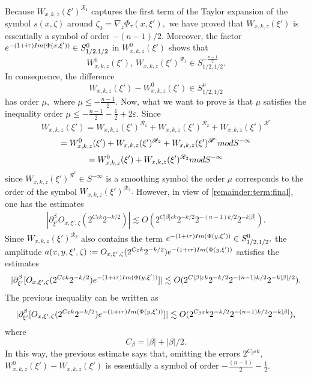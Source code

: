 \documentclass[12pt, reqno]{amsart}
\theoremstyle{definition}
\theoremstyle{remark}
\numberwithin{equation}{section}
\begin{document}
Because $W_{x,k,z}(\xi')^{\mathscr{R}_1}$ captures the first term of the Taylor expansion of the symbol $s(x,\zeta)$ around $\zeta_0=\nabla_{z}\Phi_\tau(x,\xi'),$ we have proved that $W_{x,k,z}(\xi')$ is essentially a symbol of order $-(n-1)/2.$ Moreover, the factor $e^{-(1+i\tau)\textnormal{Im}(\Phi(x,\xi'))}\in  S^{0}_{1/2,1/2}$ in $ W^{0}_{x,k,z}(\xi')$ shows that
$$ W^{0}_{x,k,z}(\xi'),\, W_{x,k,z}(\xi')^{\mathscr{R}_1}\in S^{-\frac{n-1}{2}}_{1/2,1/2}.  $$ In consequence, the difference
$$ W_{x,k,z}(\xi')- W^{0}_{x,k,z}(\xi') \in  S^{\mu}_{1/2,1/2}$$
has order $\mu,$ where $\mu\leq -\frac{n-1}{2}. $ Now, what we want to prove is that $\mu$ satisfies the inequality order $\mu\leq -\frac{n-1}{2}-\frac{1}{2}+2\varepsilon.$ Since 
$$W_{x,k,z}(\xi')=W_{x,k,z}(\xi')^{\mathscr{R}_1}+W_{x,k,z}(\xi')^{\mathscr{R}_2}+W_{x,k,z}(\xi')^{\mathscr{R}^c}$$ 
$$ = W^{0}_{x,k,z}(\xi')+W_{x,k,z}(\xi')^{\mathscr{R}_2}+W_{x,k,z}(\xi')^{\mathscr{R}^c} \textnormal{ mod }S^{-\infty}  $$
$$ = W^{0}_{x,k,z}(\xi')+W_{x,k,z}(\xi')^{\mathscr{R}_2} \textnormal{ mod }S^{-\infty}  $$
since $W_{x,k,z}(\xi')^{\mathscr{R}^c}\in S^{-\infty} $ is a smoothing symbol the order $\mu$ corresponds to the order of the symbol  $W_{x,k,z}(\xi')^{\mathscr{R}_2}.$ However, in view of \eqref{remainder:term:final}, one has the estimates
\begin{align*}
    |\partial_{\xi'}^\beta O_{x,\xi',\zeta}(2^{C\varepsilon k}2^{-k/2})|\lesssim O(2^{C|\beta|\varepsilon k}2^{-k/2}2^{-(n-1)k/2}2^{-k|\beta|}).
\end{align*}Since $W_{x,k,z}(\xi')^{\mathscr{R}_2}$ also contains the term $e^{-(1+i\tau)\textnormal{Im}(\Phi(y,\xi'))}\in  S^{0}_{1/2,1/2},$ the amplitude $a(x,y,\xi',\zeta):=O_{x,\xi',\zeta}(2^{C\varepsilon k}2^{-k/2})e^{-(1+i\tau)\textnormal{Im}(\Phi(y,\xi'))}$ satisfies the estimates
 $$ |\partial_{\xi'}^\beta [O_{x,\xi',\zeta}(2^{C\varepsilon k}2^{-k/2})e^{-(1+i\tau)\textnormal{Im}(\Phi(y,\xi'))}]|\lesssim O(2^{C|\beta|\varepsilon k}2^{-k/2}2^{-(n-1)k/2}2^{-k|\beta|/2}).
$$   The previous inequality can be written as
$$ |\partial_{\xi'}^\beta [O_{x,\xi',\zeta}(2^{C\varepsilon k}2^{-k/2})e^{-(1+i\tau)\textnormal{Im}(\Phi(y,\xi'))}]|\lesssim O(2^{C_{\beta}\varepsilon k}2^{-k/2}2^{-(n-1)k/2}2^{-k|\beta|}),
$$ where $$C_{\beta}=|\beta|+|\beta|/2.$$
In this way, the previous estimate says that, omitting the errors $2^{C_{\beta}\varepsilon k},$ $W^{0}_{x,k,z}(\xi')- W_{x,k,z}(\xi')$ is essentially a symbol of order $-\frac{(n-1)}{2}-\frac{1}{2}.$ 
\end{document}
